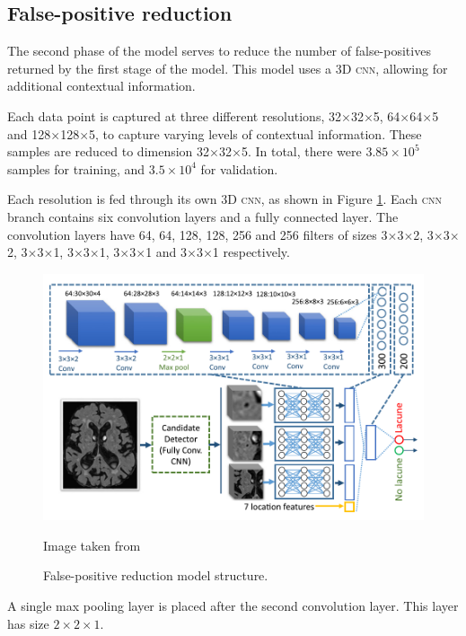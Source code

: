 \subsection*{False-positive reduction}

The second phase of the model serves to reduce the number of false-positives returned by the first stage of the model. This model uses a 3D \textsc{cnn}, allowing for additional contextual information.

Each data point is captured at three different resolutions, 32$\times$32$\times$5, 64$\times$64$\times$5 and 128$\times$128$\times$5, to capture varying levels of contextual information. These samples are reduced to dimension 32$\times$32$\times$5. In total, there were $3.85\times10^5$ samples for training, and $3.5\times10^4$ for validation. 

Each resolution is fed through its own 3D \textsc{cnn}, as shown in Figure \ref{litrev-ghafoorian_model2fig}. Each \textsc{cnn} branch contains six convolution layers and a fully connected layer. The convolution layers have 64, 64, 128, 128, 256 and 256 filters of sizes 3$\times$3$\times$2, 3$\times$3$\times$2, 3$\times$3$\times$1, 3$\times$3$\times$1, 3$\times$3$\times$1 and 3$\times$3$\times$1 respectively.

\begin{figure}[ht]
	\centering
	\includegraphics[width=\textwidth]{Images/5_ghafoorian_model2.png}
	\caption{False-positive reduction model structure.}
	\small Image taken from \cite{GhafoorianM.2017Dml3}
	\label{litrev-ghafoorian_model2fig}
\end{figure}

A single max pooling layer is placed after the second convolution layer. This layer has size $2\times2\times1$.

